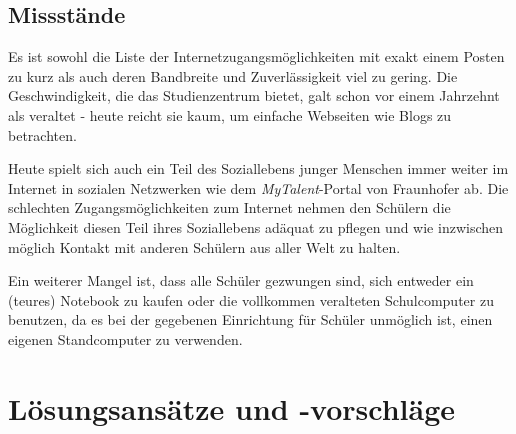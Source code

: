 \documentclass[10pt,a4paper,notitlepage]{scrartcl}
\begin{document}
\subsection{Missstände}
\begin{multicols}{2}
Es ist sowohl die Liste der Internetzugangsmöglichkeiten mit exakt einem Posten zu kurz als auch deren Bandbreite und Zuverlässigkeit viel zu gering. Die Geschwindigkeit, die das Studienzentrum bietet, galt schon vor einem Jahrzehnt als veraltet - heute reicht sie kaum, um einfache Webseiten wie Blogs zu betrachten.

Heute spielt sich auch ein Teil des Soziallebens junger Menschen immer weiter im Internet in sozialen Netzwerken wie dem \emph{MyTalent}-Portal von Fraunhofer ab. Die schlechten Zugangsmöglichkeiten zum Internet nehmen den Schülern die Möglichkeit diesen Teil ihres Soziallebens adäquat zu pflegen und wie inzwischen möglich Kontakt mit anderen Schülern aus aller Welt zu halten.

Ein weiterer Mangel ist, dass alle Schüler gezwungen sind, sich entweder ein (teures) Notebook zu kaufen oder die vollkommen veralteten Schulcomputer zu benutzen, da es bei der gegebenen Einrichtung für Schüler unmöglich ist, einen eigenen Standcomputer zu verwenden.
\end{multicols}
%
%
\section{Lösungsansätze und -vorschläge}
\end{document}
